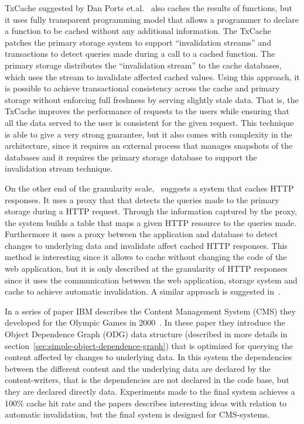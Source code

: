 TxCache suggested by Dan Ports et.al.~\cite{paper:liskov} also caches the results of functions, but it uses fully transparent programming model that allows a programmer to declare a function to be cached without any additional information. The TxCache patches the primary storage system to support ``invalidation streams'' and transactions to detect queries made during a call to a cached function. The primary storage distributes the ``invalidation stream'' to the cache databases, which uses the stream to invalidate affected cached values. Using this approach, it is possible to achieve transactional consistency across the cache and primary storage without enforcing full freshness by serving slightly stale data. That is, the TxCache improves the performance of requests to the users while ensuring that all the data served to the user is consistent for the given request. This technique is able to give a very strong guarantee, but it also comes with complexity in the architecture, since it requires an external process that manages snapshots of the databases and it requires the primary storage database to support the invalidation stream technique.

On the other end of the granularity scale,~\cite{paper:db-driven-http} suggests a system that caches HTTP responses. It uses a proxy that that detects the queries made to the primary storage during a HTTP request. Through the information captured by the proxy, the system builds a table that maps a given HTTP resource to the queries made. Furthermore it uses a proxy between the application and database to detect changes to underlying data and invalidate affect cached HTTP responses. This method is interesting since it allows to cache without changing the code of the web application, but it is only described at the granularity of HTTP responses since it uses the communication between the web application, storage system and cache to achieve automatic invalidation. A similar approach is suggested in~\cite{paper:db-driven2}.

In a series of paper IBM describes the Content Management System (CMS) they developed for the Olympic Games in 2000~\cite{paper:ibm, paper:ibm-extended, paper:ibm-publishing-system}. In these paper they introduce the Object Dependence Graph (ODG) data structure (described in more details in section~\ref{sec:simple-object-dependence-graph}) that is optimized for querying the content affected by changes to underlying data. In this system the dependencies between the different content and the underlying data are declared by the content-writers, that is the dependencies are not declared in the code base, but they are declared directly data. Experiments made to the final system achieves a 100\% cache hit rate and the papers describes interesting ideas with relation to automatic invalidation, but the final system is designed for CMS-systems.

